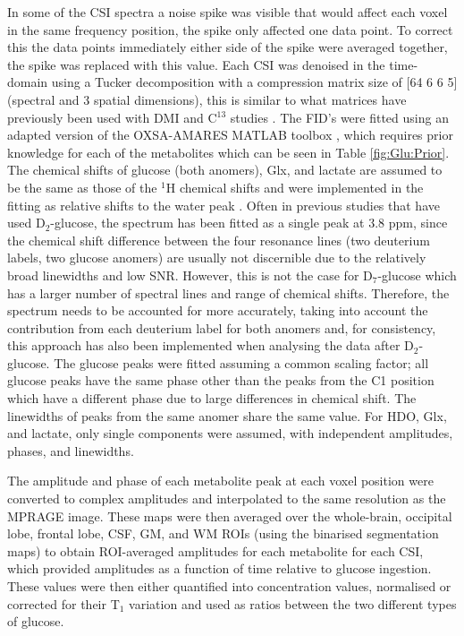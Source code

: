 \documentclass[class=article, crop=false]{standalone}
\begin{document}
In some of the CSI spectra a noise spike was visible that would affect each voxel in the same frequency position, the spike only affected one data point. To correct this the data points immediately either side of the spike were averaged together, the spike was replaced with this value. Each CSI was denoised in the time-domain using a Tucker decomposition \cite{Bader2007EfficientTensors} with a compression matrix size of [64 6 6 5] (spectral and 3 spatial dimensions), this is similar to what  matrices have previously been used with DMI \cite{vonMorze2021ComparisonT, Kreis2020MeasuringMRI} and C$^{13}$ studies \cite{Brender2019DynamicHyperpolarization}. The FID’s were fitted using an adapted version of the OXSA-AMARES MATLAB toolbox \cite{Vanhamme1997ImprovedKnowledge, Purvis2017OXSA:MATLAB}, which requires prior knowledge for each of the metabolites which can be seen in Table \ref{fig:Glu:Prior}. The chemical shifts of glucose (both anomers), Glx, and lactate are assumed to be the same as those of the $^1$H chemical shifts \cite{Govindaraju2000ProtonMetabolites} and were implemented in the fitting as relative shifts to the water peak \cite{Meerwaldt2023InImaging}. Often in previous studies that have used D$_2$-glucose, the spectrum has been fitted as a single peak at 3.8 ppm, since the chemical shift difference between the four resonance lines (two deuterium labels, two glucose anomers) are usually not discernible due to the relatively broad linewidths and low SNR. However, this is not the case for D$_7$-glucose \cite{Govindaraju2000ProtonMetabolites} which has a larger number of spectral lines and range of chemical shifts. Therefore, the spectrum needs to be accounted for more accurately, taking into account the contribution from each deuterium label for both anomers and, for consistency, this approach has also been implemented when analysing the data after D$_2$-glucose. The glucose peaks were fitted assuming a common scaling factor; all glucose peaks have the same phase other than the peaks from the C1 position which have a different phase due to large differences in chemical shift. The linewidths of peaks from the same anomer share the same value. For HDO, Glx, and lactate, only single components were assumed, with independent amplitudes, phases, and linewidths.

The amplitude and phase of each metabolite peak at each voxel position were converted to complex amplitudes and interpolated to the same resolution as the MPRAGE image. These maps were then averaged over the whole-brain, occipital lobe, frontal lobe, CSF, GM, and WM ROIs (using the binarised segmentation maps) to obtain ROI-averaged amplitudes for each metabolite for each CSI, which provided amplitudes as a function of time relative to glucose ingestion. These values were then either quantified into concentration values, normalised or corrected for their T$_1$ variation and used as ratios between the two different types of glucose.
\end{document}
